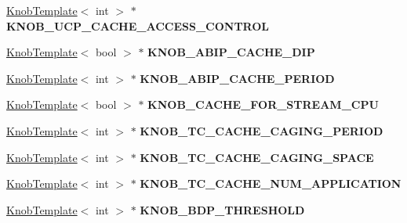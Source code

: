 \begin{DoxyCompactItemize}
\item 
\hypertarget{classall__knobs__c_a64274d14d9ebfd412ef2d2e9ebaddb06}{
\hyperlink{classKnobTemplate}{KnobTemplate}$<$ int $>$ $\ast$ {\bfseries KNOB\_\-UCP\_\-CACHE\_\-ACCESS\_\-CONTROL}}
\label{classall__knobs__c_a64274d14d9ebfd412ef2d2e9ebaddb06}

\item 
\hypertarget{classall__knobs__c_a4a10cf500e5fb8585c800fe28e24a0dd}{
\hyperlink{classKnobTemplate}{KnobTemplate}$<$ bool $>$ $\ast$ {\bfseries KNOB\_\-ABIP\_\-CACHE\_\-DIP}}
\label{classall__knobs__c_a4a10cf500e5fb8585c800fe28e24a0dd}

\item 
\hypertarget{classall__knobs__c_a9d26e02c3d77141303b03d13be46ab0d}{
\hyperlink{classKnobTemplate}{KnobTemplate}$<$ int $>$ $\ast$ {\bfseries KNOB\_\-ABIP\_\-CACHE\_\-PERIOD}}
\label{classall__knobs__c_a9d26e02c3d77141303b03d13be46ab0d}

\item 
\hypertarget{classall__knobs__c_adc92010f875e8f878e41e65e1f33cd20}{
\hyperlink{classKnobTemplate}{KnobTemplate}$<$ bool $>$ $\ast$ {\bfseries KNOB\_\-CACHE\_\-FOR\_\-STREAM\_\-CPU}}
\label{classall__knobs__c_adc92010f875e8f878e41e65e1f33cd20}

\item 
\hypertarget{classall__knobs__c_a551f4666fcd7631116089e838d705452}{
\hyperlink{classKnobTemplate}{KnobTemplate}$<$ int $>$ $\ast$ {\bfseries KNOB\_\-TC\_\-CACHE\_\-CAGING\_\-PERIOD}}
\label{classall__knobs__c_a551f4666fcd7631116089e838d705452}

\item 
\hypertarget{classall__knobs__c_a3a3c7ca19d33ecb97095a40bfe990e15}{
\hyperlink{classKnobTemplate}{KnobTemplate}$<$ int $>$ $\ast$ {\bfseries KNOB\_\-TC\_\-CACHE\_\-CAGING\_\-SPACE}}
\label{classall__knobs__c_a3a3c7ca19d33ecb97095a40bfe990e15}

\item 
\hypertarget{classall__knobs__c_ae01f149149b0a2c48abf9fdad206ba3a}{
\hyperlink{classKnobTemplate}{KnobTemplate}$<$ int $>$ $\ast$ {\bfseries KNOB\_\-TC\_\-CACHE\_\-NUM\_\-APPLICATION}}
\label{classall__knobs__c_ae01f149149b0a2c48abf9fdad206ba3a}

\item 
\hypertarget{classall__knobs__c_a25387bbfdc618398ad8c247909307107}{
\hyperlink{classKnobTemplate}{KnobTemplate}$<$ int $>$ $\ast$ {\bfseries KNOB\_\-BDP\_\-THRESHOLD}}
\label{classall__knobs__c_a25387bbfdc618398ad8c247909307107}


\end{DoxyCompactItemize}
